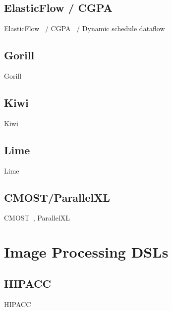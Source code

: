 \subsection{ElasticFlow / CGPA}

ElasticFlow~\cite{elasticFlow} / CGPA~\cite{cgpa} / Dynamic schedule dataflow~\cite{josipovic_fpga_2018_dynamically}
%

\subsection{Gorill}
Gorill~\cite{lavasani_thesis}

\subsection{Kiwi}
Kiwi~\cite{kiwi}

\subsection{Lime}
Lime~\cite{lime}
%

\subsection{CMOST/ParallelXL}
CMOST~\cite{zhang_DAC_2015_cmost}, ParallelXL~\cite{chen_micro_2018_parallelXL}



\section{Image Processing DSLs}

\subsection{HIPACC}
HIPACC~\cite{membarth_2016_hipa}
%


